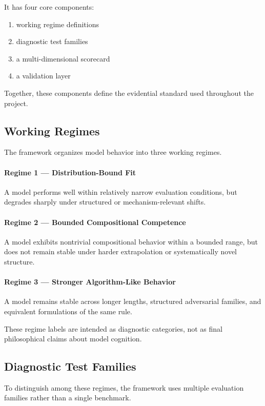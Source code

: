 \documentclass[11pt]{article}
\begin{document}
It has four core components:
\begin{enumerate}[leftmargin=1.5em]
    \item working regime definitions
    \item diagnostic test families
    \item a multi-dimensional scorecard
    \item a validation layer
\end{enumerate}

Together, these components define the evidential standard used throughout the project.

\subsection{Working Regimes}

The framework organizes model behavior into three working regimes.

\paragraph{Regime 1 — Distribution-Bound Fit}
A model performs well within relatively narrow evaluation conditions, but degrades sharply under structured or mechanism-relevant shifts.

\paragraph{Regime 2 — Bounded Compositional Competence}
A model exhibits nontrivial compositional behavior within a bounded range, but does not remain stable under harder extrapolation or systematically novel structure.

\paragraph{Regime 3 — Stronger Algorithm-Like Behavior}
A model remains stable across longer lengths, structured adversarial families, and equivalent formulations of the same rule.

These regime labels are intended as diagnostic categories, not as final philosophical claims about model cognition.

\subsection{Diagnostic Test Families}

To distinguish among these regimes, the framework uses multiple evaluation families rather than a single benchmark.
\end{document}
